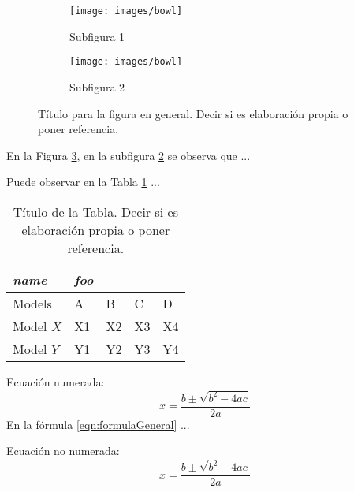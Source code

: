 \documentclass[fleqn]{Paquetes/RevDigMatEduInt}
\begin{document}
\begin{figure}[ht!!!]
	\centering
	\begin{minipage}{0.7\textwidth}
		\centering
		\begin{subfigure}{0.47\textwidth}
			\centering
			\texttt{[image: images/bowl]}
			\caption{Subfigura 1}
			\label{subfig:1}
		\end{subfigure}
		\begin{subfigure}{0.47\textwidth}
			\centering
			\texttt{[image: images/bowl]}
			\caption{Subfigura 2}
			\label{subfig:2}
		\end{subfigure}
		\caption{ Título para la figura en general. Decir si es elaboración propia o poner referencia.}
		\label{fig:2}
	\end{minipage}
\end{figure}

En la Figura \ref{fig:2}, en la subfigura \ref{subfig:2} se observa que ...


Puede observar en la Tabla \ref{tabla:nombre} ...

\begin{table}[ht!!!]
	\centering
	\begin{minipage}{0.7\textwidth}
	\caption{Título de la Tabla. Decir si es elaboración propia o poner referencia.}
	\centering
	\begin{tabular}{*5l}    \toprule
		\emph{name} & \emph{foo} & & &  \\ \midrule
		Models    & A  & B  & C  & D  \\ 
		Model $X$ & X1 & X2 & X3 & X4\\ 
		Model $Y$ & Y1 & Y2 & Y3 & Y4\\ \bottomrule
	\end{tabular}
	\label{tabla:nombre}
	\end{minipage}
\end{table}


Ecuación numerada:
\begin{equation}
	x=\frac{b\pm \sqrt{b^2-4ac}}{2a}
	\label{eqn:formulaGeneral}
\end{equation}
En la fórmula \ref{eqn:formulaGeneral} ...

Ecuación no numerada:
\begin{equation*}
	x=\frac{b\pm \sqrt{b^2-4ac}}{2a}
\end{equation*}
\end{document}
